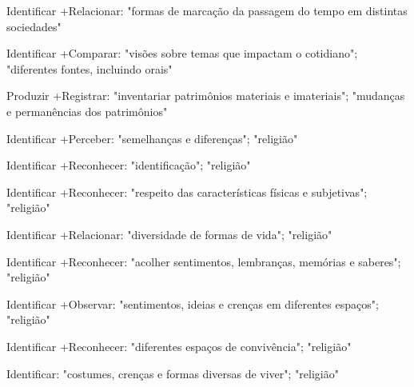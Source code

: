  Identificar +Relacionar: "formas de marcação da passagem do tempo em distintas sociedades"

 Identificar +Comparar: "visões sobre temas que impactam o cotidiano"; "diferentes fontes, incluindo orais"

 Produzir +Registrar: "inventariar patrimônios materiais e imateriais"; "mudanças e permanências dos patrimônios"

 Identificar +Perceber: "semelhanças e diferenças"; "religião"

 Identificar +Reconhecer: "identificação"; "religião"

 Identificar +Reconhecer: "respeito das características físicas e subjetivas"; "religião"

 Identificar +Relacionar: "diversidade de formas de vida"; "religião"

 Identificar +Reconhecer: "acolher sentimentos, lembranças, memórias e saberes"; "religião"

 Identificar +Observar: "sentimentos, ideias e crenças em diferentes espaços"; "religião"

 Identificar +Reconhecer: "diferentes espaços de convivência"; "religião"

 Identificar: "costumes, crenças e formas diversas de viver"; "religião"

